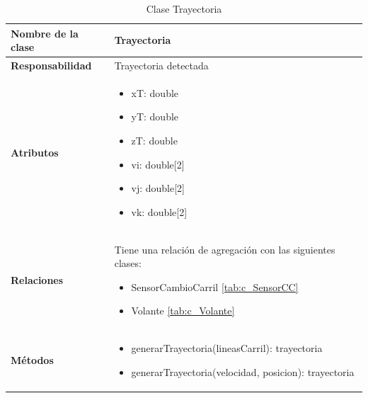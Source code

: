\begin{table}[h]
\begin{center}
\begin{tabular}{p{} p{11cm}}
\textbf{Nombre de la clase} &  Trayectoria\\ \hline \hline
\textbf{Responsabilidad} &  Trayectoria detectada\\ \hline
\textbf{Atributos} &  \begin{itemize}
                        \item xT: double
                        \item yT: double
                        \item zT: double
                        \item vi: double[2]
                        \item vj: double[2]
                        \item vk: double[2]
                      \end{itemize}
                      \\ \hline
\textbf{Relaciones} & \par Tiene una relación de agregación con las siguientes clases:
                      \begin{itemize}
                        \item SensorCambioCarril \ref{tab:c_SensorCC}
                        \item Volante \ref{tab:c_Volante}
                      \end{itemize}
                      \\ \hline

\textbf{Métodos} &  \begin{itemize}
                      \item generarTrayectoria(lineasCarril): trayectoria
                      \item generarTrayectoria(velocidad, posicion): trayectoria
                    \end{itemize}\\ \hline
\end{tabular}
\caption{Clase Trayectoria}
\label{tab:c_trayectoria}
\end{center}
\end{table}









